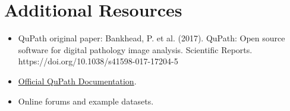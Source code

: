 \documentclass[a4paper,DIV=17,dvipsnames,headsepline]{scrartcl}
\begin{document}
\section{Additional Resources}
\begin{itemize}
    \item QuPath original paper: Bankhead, P. et al. (2017). QuPath: Open source software for digital pathology image analysis. Scientific Reports. https://doi.org/10.1038/s41598-017-17204-5
    \item \href{https://qupath.github.io/}{Official QuPath Documentation}.
    \item Online forums and example datasets.
\end{itemize}

\appendix


\printendnotes
\end{document}
